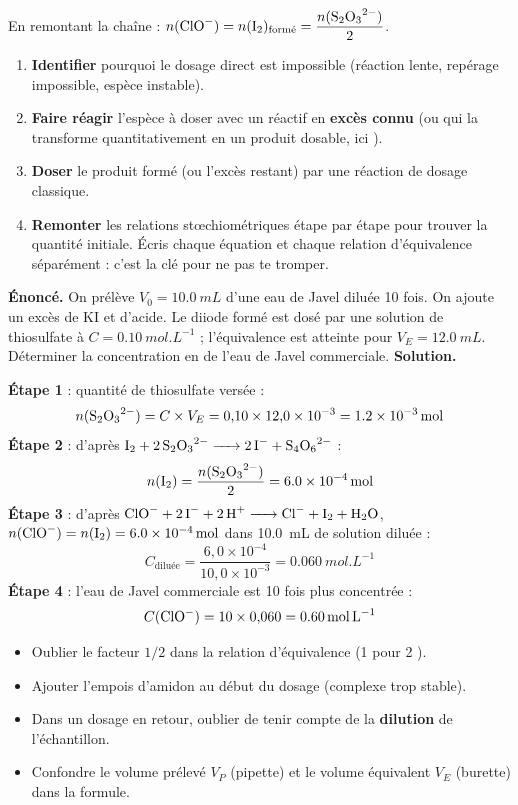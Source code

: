 \documentclass[11pt]{article}
\begin{document}
En remontant la chaîne : $n(\ce{ClO-}) = n(\ce{I2})_{\text{formé}} = \dfrac{n(\ce{S2O3^2-})}{2}$.

\begin{methode}
\begin{enumerate}
\item \textbf{Identifier} pourquoi le dosage direct est impossible (réaction lente, repérage impossible, espèce instable).
\item \textbf{Faire réagir} l'espèce à doser avec un réactif en \textbf{excès connu} (ou qui la transforme quantitativement en un produit dosable, ici ).
\item \textbf{Doser} le produit formé (ou l'excès restant) par une réaction de dosage classique.
\item \textbf{Remonter} les relations stœchiométriques étape par étape pour trouver la quantité initiale. Écris chaque équation et chaque relation d'équivalence séparément : c'est la clé pour ne pas te tromper.
\end{enumerate}
\end{methode}

\begin{exoresolu}
\textbf{Énoncé.} On prélève $V_0 = \SI{10,0}{mL}$ d'une eau de Javel diluée 10 fois. On ajoute un excès de KI et d'acide. Le diiode formé est dosé par une solution de thiosulfate à $C = \SI{0,10}{mol.L^{-1}}$ ; l'équivalence est atteinte pour $V_E = \SI{12,0}{mL}$. Déterminer la concentration en  de l'eau de Javel commerciale.
\tcblower
\textbf{Solution.}\par
\textbf{Étape 1} : quantité de thiosulfate versée :
\[ n(\ce{S2O3^2-}) = C \times V_E = 0{,}10 \times 12{,}0 \times 10^{-3} = \SI{1,2e-3}{mol} \]
\textbf{Étape 2} : d'après $\ce{I2 + 2S2O3^2- -> 2I- + S4O6^2-}$ :
\[ n(\ce{I2}) = \frac{n(\ce{S2O3^2-})}{2} = \SI{6,0e-4}{mol} \]
\textbf{Étape 3} : d'après $\ce{ClO- + 2I- + 2H+ -> Cl- + I2 + H2O}$, $n(\ce{ClO-}) = n(\ce{I2}) = \SI{6,0e-4}{mol}$ dans \SI{10,0}{mL} de solution diluée :
\[ C_{\text{diluée}} = \frac{6{,}0 \times 10^{-4}}{10{,}0 \times 10^{-3}} = \SI{0,060}{mol.L^{-1}} \]
\textbf{Étape 4} : l'eau de Javel commerciale est 10 fois plus concentrée :
\[ C(\ce{ClO-}) = 10 \times 0{,}060 = \SI{0,60}{mol.L^{-1}} \]
\end{exoresolu}

\begin{attention}
\begin{itemize}
\item Oublier le facteur $1/2$ dans la relation d'équivalence (1  pour 2 ).
\item Ajouter l'empois d'amidon au début du dosage (complexe trop stable).
\item Dans un dosage en retour, oublier de tenir compte de la \textbf{dilution} de l'échantillon.
\item Confondre le volume prélevé $V_P$ (pipette) et le volume équivalent $V_E$ (burette) dans la formule.
\end{itemize}
\end{attention}
\end{document}
